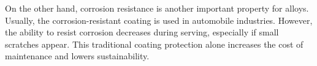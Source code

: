 On the other hand, corrosion resistance is another important property for alloys. Usually, the corrosion-resistant coating is used in automobile industries. However, the ability to resist corrosion decreases during serving, especially if small scratches appear. This traditional coating protection alone increases the cost of maintenance and lowers sustainability.